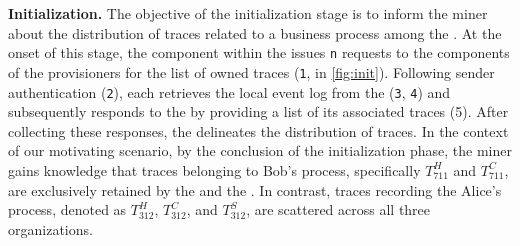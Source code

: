 \textbf{Initialization.} The objective of the initialization stage is to inform the miner about the distribution of traces related to a business process among the . At the onset of this stage, the  component within the  issues \texttt{n} requests to the  components of the provisioners for the list of owned traces (\texttt{1}, in \cref{fig:init}). Following sender authentication (\texttt{2}), each  retrieves the local event log from the  (\texttt{3}, \texttt{4}) and subsequently responds to the  by providing a list of its associated traces (5). After collecting these  responses, the  delineates the distribution of traces. In the context of our motivating scenario, by the conclusion of the initialization phase, the miner gains knowledge that traces belonging to Bob's process, specifically $T^H_{711}$ and $T^C_{711}$, are exclusively retained by the  and the . In contrast, traces recording the Alice's process, denoted as $T^H_{312}$, $T^C_{312}$, and $T^S_{312}$, are scattered across all three organizations.

